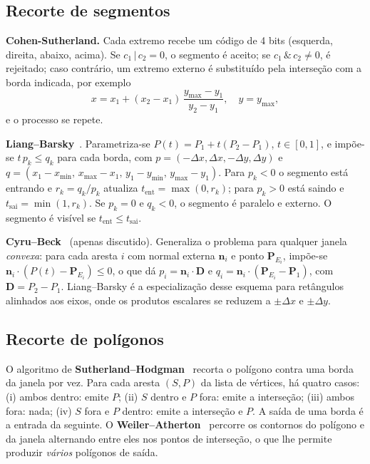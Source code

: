 \subsection{Recorte de segmentos}
\textbf{Cohen-Sutherland.} Cada extremo recebe um código de 4 bits (esquerda, direita, abaixo, acima). Se $c_1\,|\,c_2=0$, o segmento é aceito; se $c_1\,\&\,c_2\neq0$, é rejeitado; caso contrário, um extremo externo é substituído pela interseção com a borda indicada, por exemplo
\begin{equation}
x = x_1 + (x_2-x_1)\,\frac{y_{\max}-y_1}{y_2-y_1},\quad y=y_{\max},
\end{equation}
e o processo se repete.

\textbf{Liang--Barsky}~\cite{liangbarsky1984}. Parametriza-se $P(t)=P_1+t(P_2-P_1)$, $t\in[0,1]$, e impõe-se $t\,p_k\le q_k$ para cada borda, com
$p=(-\Delta x,\Delta x,-\Delta y,\Delta y)$ e $q=(x_1-x_{\min},\,x_{\max}-x_1,\,y_1-y_{\min},\,y_{\max}-y_1)$. Para $p_k<0$ o segmento está entrando e $r_k=q_k/p_k$ atualiza $t_{\text{ent}}=\max(0,r_k)$; para $p_k>0$ está saindo e $t_{\text{sai}}=\min(1,r_k)$. Se $p_k=0$ e $q_k<0$, o segmento é paralelo e externo. O segmento é visível se $t_{\text{ent}}\le t_{\text{sai}}$.

\textbf{Cyru--Beck}~\cite{cyrusbeck1978} (apenas discutido). Generaliza o problema para qualquer janela \emph{convexa}: para cada aresta $i$ com normal externa $\mathbf n_i$ e ponto $\mathbf P_{E_i}$, impõe-se $\mathbf n_i\cdot(P(t)-\mathbf P_{E_i})\le0$, o que dá $p_i=\mathbf n_i\cdot\mathbf D$ e $q_i=\mathbf n_i\cdot(\mathbf P_{E_i}-\mathbf P_1)$, com $\mathbf D=P_2-P_1$. Liang--Barsky é a especialização desse esquema para retângulos alinhados aos eixos, onde os produtos escalares se reduzem a $\pm\Delta x$ e $\pm\Delta y$.

\subsection{Recorte de polígonos}
O algoritmo de \textbf{Sutherland--Hodgman}~\cite{sutherlandhodgman1974} recorta o polígono contra uma borda da janela por vez. Para cada aresta $(S,P)$ da lista de vértices, há quatro casos: (i) ambos dentro: emite $P$; (ii) $S$ dentro e $P$ fora: emite a interseção; (iii) ambos fora: nada; (iv) $S$ fora e $P$ dentro: emite a interseção e $P$. A saída de uma borda é a entrada da seguinte. O \textbf{Weiler--Atherton}~\cite{weileratherton1977} percorre os contornos do polígono e da janela alternando entre eles nos pontos de interseção, o que lhe permite produzir \emph{vários} polígonos de saída.